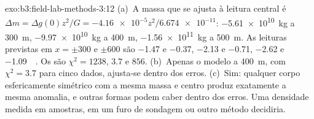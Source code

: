 \begin{solution}{exo:b3:field-lab-methods-3:12}
(a)~A massa que se ajusta à leitura central é $\Delta m = \Delta g(0)z^2/G
= \num{-4.16e-5}z^2/\num{6.674e-11}$: \qty{-5.61e10}{kg} a
\qty{300}{m}, \qty{-9.97e10}{kg} a \qty{400}{m}, \qty{-1.56e11}{kg} a
\qty{500}{m}. As leituras previstas em $x = \pm300$ e $\pm600$ são
\num{-1.47} e \num{-0.37}, \num{-2.13} e \num{-0.71}, \num{-2.62}
e \qty{-1.09}{\milli\gal}. Os  são $\chi^2 = 1238$, $3.7$ e
$856$. (b)~Apenas o modelo a \qty{400}{m}, com $\chi^2 = 3.7$ para cinco
dados, ajusta-se dentro dos erros. (c)~Sim: qualquer corpo esfericamente simétrico
com a mesma massa e centro produz exatamente a mesma anomalia, e outras
formas podem caber dentro dos erros. Uma densidade medida em amostras, em um
furo de sondagem ou outro método decidiria.
\end{solution}

